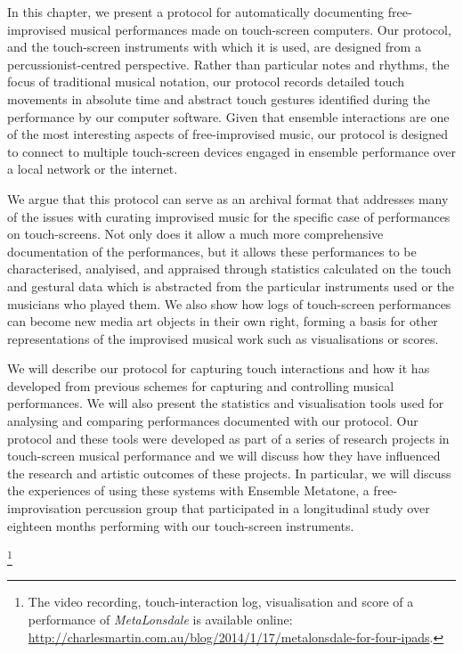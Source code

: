 \documentclass[graybox]{svmult}
\begin{document}
In this chapter, we present a protocol for automatically documenting
free-improvised musical performances made on touch-screen computers.
Our protocol, and the touch-screen instruments with which it is used,
are designed from a percussionist-centred perspective. Rather than
particular notes and rhythms, the focus of traditional musical
notation, our protocol records detailed touch movements in absolute
time and abstract touch gestures identified during the performance by our
computer software. Given that ensemble interactions are one of the
most interesting aspects of free-improvised music, our protocol is designed
to connect to multiple touch-screen devices engaged in ensemble
performance over a local network or the internet.

We argue that this protocol can serve as an archival format that
addresses many of the issues with curating improvised music for the
specific case of performances on touch-screens. Not only does it allow
a much more comprehensive documentation of the performances, but it
allows these performances to be characterised, analyised, and
appraised through statistics calculated on the touch and gestural data
which is abstracted from the particular instruments used or the
musicians who played them. We also show how logs of touch-screen
performances can become new media art objects in their own right,
forming a basis for other representations of the improvised musical
work such as visualisations or scores.

We will describe our protocol for capturing touch interactions and how
it has developed from previous schemes for capturing and controlling
musical performances. We will also present the statistics and
visualisation tools used for analysing and comparing performances
documented with our protocol. Our protocol and these tools were
developed as part of a series of research projects in touch-screen
musical performance and we will discuss how they have influenced the
research and artistic outcomes of these projects. In particular, we
will discuss the experiences of using these systems with Ensemble
Metatone, a free-improvisation percussion group that participated in a
longitudinal study over eighteen months performing with our
touch-screen instruments.


\footnote{\label{note1}The video recording, touch-interaction log,
  visualisation and score of a performance of \emph{MetaLonsdale} is
  available online:
  \url{http://charlesmartin.com.au/blog/2014/1/17/metalonsdale-for-four-ipads}.}
\end{document}
